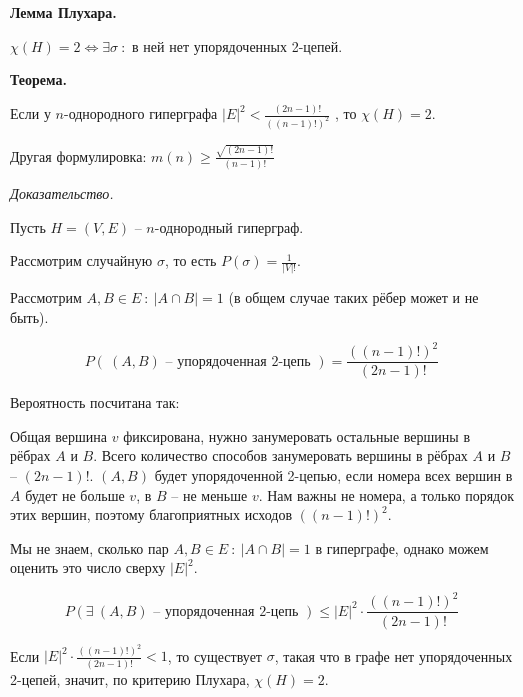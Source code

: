 \textbf{Лемма Плухара.}

$\chi(H) = 2 \Leftrightarrow \exists \sigma \ :$ в ней нет упорядоченных 2-цепей.

\textbf{Теорема.}

Если у $n$-однородного гиперграфа 
$
|E|^2 < \frac{(2n - 1)!}{\left( (n - 1)! \right)^2}
$
, то $\chi(H) = 2$.

Другая формулировка: $m(n) \geqslant \frac{\sqrt{(2n - 1)!}}{(n - 1)!}$

\textit{Доказательство.}

Пусть $H = (V, E)$ -- $n$-однородный гиперграф.

Рассмотрим случайную $\sigma$, то есть $P(\sigma) = \frac{1}{|V|!}$.

Рассмотрим $A, B \in E\ :\ |A \cap B| = 1$ (в общем случае таких рёбер может и не быть).

$$
P(\ (A, B) \text{ -- упорядоченная 2-цепь }) = \frac{\left( (n - 1)! \right)^2}{(2n - 1)!}
$$

Вероятность посчитана так:

Общая вершина $v$ фиксирована, нужно занумеровать остальные вершины в рёбрах $A$ и $B$.
Всего количество способов занумеровать вершины в рёбрах $A$ и $B$ -- $(2n - 1)!$.
$(A, B)$ будет упорядоченной 2-цепью, если номера всех вершин в $A$ будет не больше $v$, в $B$ -- не меньше $v$. Нам важны не номера, а только порядок этих вершин, поэтому благоприятных исходов $\left( (n - 1)! \right)^2$.

Мы не знаем, сколько пар $A, B \in E\ :\ |A \cap B| = 1$ в гиперграфе, однако можем оценить это число сверху $|E|^2$.

$$
P(\exists \ (A, B) \text{ -- упорядоченная 2-цепь }) 
\leqslant |E|^2 \cdot \frac{\left( (n - 1)! \right)^2}{(2n - 1)!}
$$

Если $|E|^2 \cdot \frac{\left( (n - 1)! \right)^2}{(2n - 1)!} < 1$, то существует $\sigma$, такая что в графе нет упорядоченных 2-цепей, значит, по критерию Плухара, $\chi(H) = 2$.